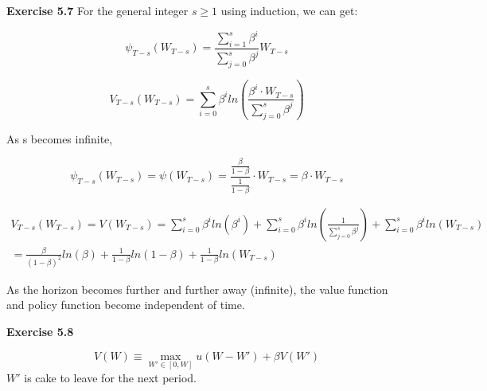\documentclass[letterpaper,12pt]{article}
\theoremstyle{definition}
\begin{document}
\noindent\textbf{Exercise 5.7}
For the general integer $s \geq 1$ using induction, we can get:

\begin{equation*}
\psi_{T-s}(W_{T-s})=\frac{\sum\limits_{i=1}^{s}\beta^{i}}{\sum\limits_{j=0}^{s}\beta^{j}}W_{T-s}
\end{equation*}

\begin{equation*}
V_{T-s}(W_{T-s}) = \sum\limits_{i=0}^{s} \beta^{i}ln\left(\frac{\beta^{i}\cdot W_{T-s}}{\sum\limits_{j=0}^{s}\beta^{j}}\right)
\end{equation*}

As s becomes infinite, 

\begin{equation*}
\psi_{T-s}(W_{T-s})= \psi(W_{T-s})=\frac{\frac{\beta }{1-\beta }}{\frac{1}{1-\beta }}\cdot W_{T-s}=\beta\cdot W_{T-s}
\end{equation*}

\begin{equation*}
\begin{aligned}
V_{T-s}(W_{T-s}) = V(W_{T-s}) =\sum\limits_{i=0}^{s} \beta^{i}ln(\beta^{i})+  \sum\limits_{i=0}^{s} \beta^{i}ln(\frac{1}{\sum\limits_{j=0}^{s}\beta^{j}})+\sum\limits_{i=0}^{s} \beta^{i} ln(W_{T-s}) \\
=\frac{\beta }{(1-\beta)^2}ln(\beta) +\frac{1 }{1-\beta}ln(1-\beta )+\frac{1 }{1-\beta}ln(W_{T-s})
\end{aligned}
\end{equation*}



As the horizon becomes further and further away (infinite), the value function and policy function become independent of time.


\noindent\textbf{Exercise 5.8}

$$V(W)\equiv \max_{W'\in [ 0,W]}u(W-W')+\beta V(W') $$
$W'$ is cake to leave for the next period.
\end{document}
